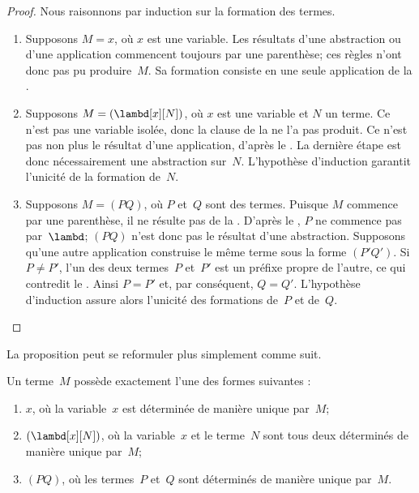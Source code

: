 \documentclass[../../../include/open-logic-section]{subfiles}
\begin{document}
\begin{proof}
Nous raisonnons par induction sur la formation
des termes.
\begin{enumerate}
\item Supposons $M=x$, où $x$ est une variable.
  Les résultats d'une abstraction ou d'une
  application commencent toujours par une
  parenthèse; ces règles n'ont donc pas pu
  produire~$M$. Sa formation consiste en une
  seule application de la
  .
\item Supposons $M=(\lambd[x][N])$, où $x$
  est une variable et $N$ un terme. Ce n'est
  pas une variable isolée, donc la clause de la
  ne l'a pas produit. Ce n'est pas non plus
  le résultat d'une application, d'après le
  . La dernière étape
  est donc nécessairement une abstraction
  sur~$N$. L'hypothèse d'induction garantit
  l'unicité de la formation de~$N$.
\item Supposons $M=(PQ)$, où $P$ et~$Q$
  sont des termes. Puisque $M$ commence par
  une parenthèse, il ne résulte pas de la
  .
  D'après le , $P$ ne
  commence pas par~$\lambd$; $(PQ)$ n'est
  donc pas le résultat d'une abstraction.
  Supposons qu'une autre application construise
  le même terme sous la forme $(P'Q')$. Si
  $P\ne P'$, l'un des deux termes~$P$ et~$P'$
  est un préfixe propre de l'autre, ce qui
  contredit le . Ainsi $P=P'$
  et, par conséquent, $Q=Q'$. L'hypothèse
  d'induction assure alors l'unicité des
  formations de~$P$ et de~$Q$.
\end{enumerate}
\end{proof}

La proposition peut se reformuler plus
simplement comme suit.
\begin{prop}
Un terme~$M$ possède exactement l'une des
formes suivantes :
\begin{enumerate}
\item $x$, où la variable~$x$ est déterminée
  de manière unique par~$M$;
\item $(\lambd[x][N])$, où la variable~$x$
  et le terme~$N$ sont tous deux déterminés
  de manière unique par~$M$;
\item $(PQ)$, où les termes~$P$ et~$Q$ sont
  déterminés de manière unique par~$M$.
\end{enumerate}
\end{prop}
\end{document}
